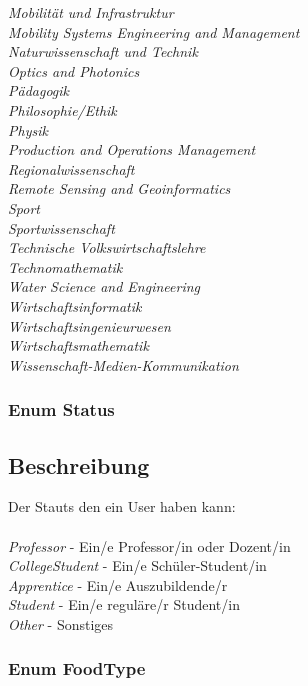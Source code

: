 \documentclass[a4paper]{scrreprt}
\begin{document}
\textit{Mobilität und Infrastruktur}\\
\textit{Mobility Systems Engineering and Management}\\
\textit{Naturwissenschaft und Technik} \\
\textit{Optics and Photonics}\\
\textit{Pädagogik}\\
\textit{Philosophie/Ethik}\\
\textit{Physik}\\
\textit{Production and Operations Management}\\
\textit{Regionalwissenschaft}\\
\textit{Remote Sensing and Geoinformatics}\\
\textit{Sport}\\
\textit{Sportwissenschaft}\\
\textit{Technische Volkswirtschaftslehre} \\
\textit{Technomathematik}\\
\textit{Water Science and Engineering}\\
\textit{Wirtschaftsinformatik}\\
\textit{Wirtschaftsingenieurwesen}\\
\textit{Wirtschaftsmathematik}\\
\textit{Wissenschaft-Medien-Kommunikation}\\



\subsubsection{Enum Status}
\subsection*{Beschreibung}
Der Stauts den ein User haben kann: 
\\ \\ \textit{Professor} - Ein/e Professor/in oder Dozent/in \\
\textit{CollegeStudent} -  Ein/e Schüler-Student/in \\ 
\textit{Apprentice} - Ein/e Auszubildende/r \\
\textit{Student} - Ein/e reguläre/r Student/in \\
\textit{Other} - Sonstiges \\

\newpage
\subsubsection{Enum FoodType}
\end{document}
